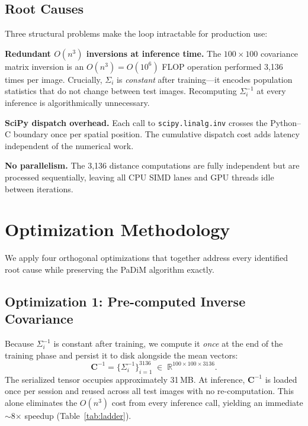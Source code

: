 \documentclass[blind]{gtac}
\begin{document}
\subsection{Root Causes}

Three structural problems make the loop intractable for production use:

\textbf{Redundant $O(n^3)$ inversions at inference time.}  The
$100\!\times\!100$ covariance matrix inversion is an $O(n^3)\!=\!O(10^6)$
FLOP operation performed 3{,}136 times per image.  Crucially, $\Sigma_i$ is
\emph{constant} after training---it encodes population statistics that do not
change between test images.  Recomputing $\Sigma_i^{-1}$ at every inference is
algorithmically unnecessary.

\textbf{SciPy dispatch overhead.}  Each call to \texttt{scipy.linalg.inv}
crosses the Python--C boundary once per spatial position.  The cumulative
dispatch cost adds latency independent of the numerical work.

\textbf{No parallelism.}  The 3{,}136 distance computations are fully
independent but are processed sequentially, leaving all CPU SIMD lanes and GPU
threads idle between iterations.

\section{Optimization Methodology}
\label{sec:method}

We apply four orthogonal optimizations that together address every identified
root cause while preserving the PaDiM algorithm exactly.

\subsection{Optimization 1: Pre-computed Inverse Covariance}

Because $\Sigma_i^{-1}$ is constant after training, we compute it \emph{once}
at the end of the training phase and persist it to disk alongside the mean
vectors:
%
\begin{equation}
  \mathbf{C}^{-1} = \bigl\{\Sigma_i^{-1}\bigr\}_{i=1}^{3136}
  \;\in\; \mathbb{R}^{100 \times 100 \times 3136}.
\end{equation}
%
The serialized tensor occupies approximately 31\,MB.  At inference,
$\mathbf{C}^{-1}$ is loaded once per session and reused across all test images
with no re-computation.  This alone eliminates the $O(n^3)$ cost from every
inference call, yielding an immediate $\sim$8$\times$ speedup
(Table~\ref{tab:ladder}).
\end{document}
